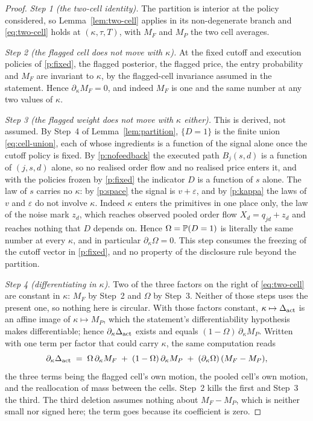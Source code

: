 \begin{proof}
\emph{Step 1 (the two-cell identity).} The partition is interior at the policy considered, so
Lemma~\ref{lem:two-cell} applies in its non-degenerate branch and \eqref{eq:two-cell} holds at
$(\kappa,\tau,T)$, with $M_F$ and $M_P$ the two cell averages.

\emph{Step 2 (the flagged cell does not move with $\kappa$).} At the fixed cutoff and execution
policies of \ref{p:fixed}, the flagged posterior, the flagged price, the entry probability and $M_F$
are invariant to $\kappa$, by the flagged-cell invariance assumed in the statement. Hence
$\partial_\kappa M_F = 0$, and indeed $M_F$ is one and the same number at any two values of
$\kappa$.

\emph{Step 3 (the flagged weight does not move with $\kappa$ either).} This is derived, not assumed.
By Step~4 of Lemma~\ref{lem:partition}, $\{D = 1\}$ is the finite union \eqref{eq:cell-union}, each
of whose ingredients is a function of the signal alone once the cutoff policy is fixed. By
\ref{p:nofeedback} the executed path $B_j(s,d)$ is a function of $(j,s,d)$ alone, so no realised
order flow and no realised price enters it, and with the policies frozen by \ref{p:fixed} the
indicator $D$ is a function of $s$ alone. The law of $s$ carries no $\kappa$: by \ref{p:space} the
signal is $v + \varepsilon$, and by \ref{p:kappa} the laws of $v$ and $\varepsilon$ do not involve
$\kappa$. Indeed $\kappa$ enters the primitives in one place only, the law of the noise mark $z_d$,
which reaches observed pooled order flow $X_d = q_{jd} + z_d$ and reaches nothing that $D$ depends
on. Hence $\Omega = \mathbb{P}(D = 1)$ is literally the same number at every $\kappa$, and in particular
$\partial_\kappa\Omega = 0$. This step consumes the freezing of the cutoff vector in \ref{p:fixed},
and no property of the disclosure rule beyond the partition.

\emph{Step 4 (differentiating in $\kappa$).} Two of the three factors on the right of
\eqref{eq:two-cell} are constant in $\kappa$: $M_F$ by Step~2 and $\Omega$ by Step~3. Neither of
those steps uses the present one, so nothing here is circular. With those factors constant,
$\kappa \mapsto \Delta_{\mathrm{act}}$ is an affine image of $\kappa \mapsto M_P$, which the statement's
differentiability hypothesis makes differentiable; hence $\partial_\kappa\Delta_{\mathrm{act}}$ exists and equals
$(1 - \Omega)\,\partial_\kappa M_P$. Written with one term per factor that could carry $\kappa$, the
same computation reads
\begin{equation}
\label{eq:three-term}
  \partial_\kappa\Delta_{\mathrm{act}}
  \;=\; \Omega\,\partial_\kappa M_F
  \;+\; (1 - \Omega)\,\partial_\kappa M_P
  \;+\; (\partial_\kappa\Omega)\,(M_F - M_P),
\end{equation}
the three terms being the flagged cell's own motion, the pooled cell's own motion, and the
reallocation of mass between the cells. Step~2 kills the first and Step~3 the third. The third
deletion assumes nothing about $M_F - M_P$, which is neither small nor signed here; the term goes
because its coefficient is zero.


\end{proof}
